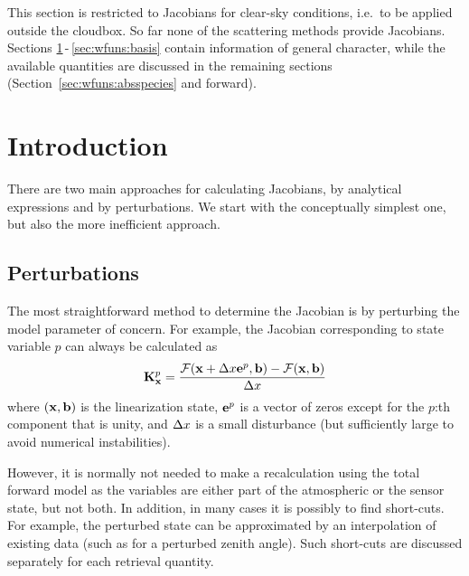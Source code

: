 This section is restricted to Jacobians for clear-sky conditions, i.e.\ to be
applied outside the cloudbox. So far none of the scattering methods provide
Jacobians. Sections \ref{sec:wfuns:intro}\,-\,\ref{sec:wfuns:basis} contain
information of general character, while the available quantities are discussed
in the remaining sections (Section~\ref{sec:wfuns:absspecies} and forward).



\section{Introduction}
\label{sec:wfuns:intro}
%
There are two main approaches for calculating Jacobians, by analytical
expressions and by perturbations. We start with the conceptually simplest one,
but also the more inefficient approach.



\subsection{Perturbations}
\label{sec:wfuns:pert}
%
The most straightforward method to determine the Jacobian is by perturbing the
model parameter of concern. For example, the Jacobian corresponding to state
variable $p$ can always be calculated as
\begin{equation}
  \mathbf{K}_{\mathbf{x}}^p = \frac{\mathcal{F}(\mathbf{x}+\Delta x\mathbf{e}^p,
                      \mathbf{b})-\mathcal{F}(\mathbf{x},\mathbf{b})} {\Delta x}
 \label{eq:wfuns:perturb}
\end{equation}
where $(\mathbf{x},\mathbf{b})$ is the linearization state, $\mathbf{e}^p$ is a
vector of zeros except for the $p$:th component that is unity, and
$\Delta x$ is a small disturbance (but sufficiently large to avoid
numerical instabilities).

However, it is normally not needed to make a recalculation using the total
forward model as the variables are either part of the atmospheric or the sensor
state, but not both. In addition, in many cases it is possibly to find
short-cuts. For example, the perturbed state can be approximated by an
interpolation of existing data (such as for a perturbed zenith angle). Such
short-cuts are discussed separately for each retrieval quantity.


